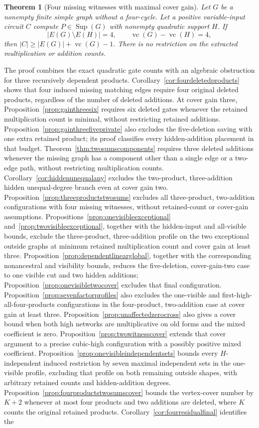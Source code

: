 \documentclass[11pt]{article}
\newcommand{\Sup}{\operatorname{Sup}}
\newcommand{\vc}{\operatorname{vc}}
\newtheorem{theorem}{Theorem}[section]
\theoremstyle{definition}
\theoremstyle{remark}
\begin{document}
\begin{theorem}[Four missing witnesses with maximal cover gain]\label{thm:maxfour}
Let $G$ be a nonempty finite simple graph without a four-cycle. Let a positive variable-input circuit $C$ compute $P\in\Sup(G)$ with nonempty quadratic support $H$. If
\[
 |E(G)\setminus E(H)|=4,\qquad \vc(G)-\vc(H)=4,
\]
then $|C|\ge |E(G)|+\vc(G)-1$. There is no restriction on the extracted multiplication or addition counts.
\end{theorem}
The proof combines the exact quadratic gate counts with an algebraic obstruction for three recursively dependent products. Corollary~\ref{cor:fourdeletedproducts} shows that four induced missing matching edges require four original deleted products, regardless of the number of deleted additions. At cover gain three, Proposition~\ref{prop:gainthreesix} requires six deleted gates whenever the retained multiplication count is minimal, without restricting retained additions. Proposition~\ref{prop:gainthreefiveprivate} also excludes the five-deletion saving with one extra retained product; its proof classifies every hidden-addition placement in that budget. Theorem~\ref{thm:twosumscomponents} requires three deleted additions whenever the missing graph has a component other than a single edge or a two-edge path, without restricting multiplication counts. Corollary~\ref{cor:hiddenunequalany} excludes the two-product, three-addition hidden unequal-degree branch even at cover gain two. Proposition~\ref{prop:threeproductstwosums} excludes all three-product, two-addition configurations with four missing witnesses, without retained-count or cover-gain assumptions. Propositions~\ref{prop:onevisibleexceptional} and~\ref{prop:twovisibleexceptional}, together with the hidden-input and all-visible bounds, exclude the three-product, three-addition profile on the two exceptional outside graphs at minimum retained multiplication count and cover gain at least three. Proposition~\ref{prop:dependentlinearglobal}, together with the corresponding nonancestral and visibility bounds, reduces the five-deletion, cover-gain-two case to one visible cut and two hidden additions; Proposition~\ref{prop:onevisibletwocover} excludes that final configuration. Proposition~\ref{prop:sevenfactorprofiles} also excludes the one-visible and first-high-all-four-products configurations in the four-product, two-addition case at cover gain at least three. Proposition~\ref{prop:unaffectedzerocross} also gives a cover bound when both high networks are multiplicative on old forms and the mixed coefficient is zero. Proposition~\ref{prop:twowitnesscover} extends that cover argument to a precise cubic-high configuration with a possibly positive mixed coefficient. Proposition~\ref{prop:onevisibleindependentsets} bounds every $H$-independent induced restriction by seven maximal independent sets in the one-visible profile, excluding that profile on both remaining outside shapes, with arbitrary retained counts and hidden-addition degrees. Proposition~\ref{prop:fourproductstwosumscover} bounds the vertex-cover number by $K+2$ whenever at most four products and two additions are deleted, where $K$ counts the original retained products. Corollary~\ref{cor:fourresidualfinal} identifies the 
\end{document}
